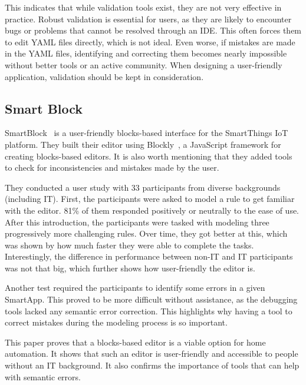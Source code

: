 \documentclass[11pt,a4paper]{report}
\begin{document}
This indicates that while validation tools exist, they are not very effective in practice. Robust validation is essential for users, as they are likely to encounter bugs or problems that cannot be resolved through an IDE. This often forces them to edit YAML files directly, which is not ideal. Even worse, if mistakes are made in the YAML files, identifying and correcting them becomes nearly impossible without better tools or an active community. When designing a user-friendly application, validation should be kept in consideration.

\subsection{Smart Block}
\label{SmartBlock}
SmartBlock~\cite{SOTA_SmartBlock} is a user-friendly blocks-based interface for the SmartThings IoT platform. They built their editor using Blockly~\cite{Blockly}, a JavaScript framework for creating blocks-based editors. It is also worth mentioning that they added tools to check for inconsistencies and mistakes made by the user.

They conducted a user study with 33 participants from diverse backgrounds (including IT). First, the participants were asked to model a rule to get familiar with the editor. 81\% of them responded positively or neutrally to the ease of use. After this introduction, the participants were tasked with modeling three progressively more challenging rules. Over time, they got better at this, which was shown by how much faster they were able to complete the tasks. Interestingly, the difference in performance between non-IT and IT participants was not that big, which further shows how user-friendly the editor is.

Another test required the participants to identify some errors in a given SmartApp. This proved to be more difficult without assistance, as the debugging tools lacked any semantic error correction. This highlights why having a tool to correct mistakes during the modeling process is so important.

This paper proves that a blocks-based editor is a viable option for home automation. It shows that such an editor is user-friendly and accessible to people without an IT background. It also confirms the importance of tools that can help with semantic errors.
\end{document}
